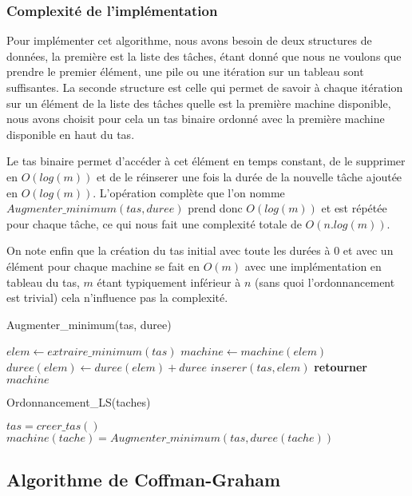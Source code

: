 \subsubsection{Complexité de l'implémentation}
Pour implémenter cet algorithme, nous avons besoin de deux structures de 
données, la première est la liste des tâches, étant donné que nous ne voulons 
que prendre le premier élément, une pile ou une itération sur un tableau sont 
suffisantes. La seconde structure est celle qui permet de savoir à chaque 
itération sur un élément de la liste des tâches quelle est la première machine 
disponible, nous avons choisit pour cela un tas binaire ordonné avec la première 
machine disponible en haut du tas.

Le tas binaire permet d'accéder à cet élément en temps constant, de le supprimer 
en $O(log(m))$ et de le réinserer une fois la durée de la nouvelle tâche ajoutée 
en $O(log(m))$.
L'opération complète que l'on nomme $Augmenter\_minimum(tas, duree)$ prend donc 
$O(log(m))$ et est répétée pour chaque tâche, ce qui nous fait une complexité 
totale de $O(n.log(m))$.

On note enfin que la création du tas initial avec toute les durées à 0 et avec 
un élément pour chaque machine se fait en $O(m)$ avec une implémentation en 
tableau du tas, $m$ étant typiquement inférieur à $n$ (sans quoi 
l'ordonnancement est trivial) cela n'influence pas la complexité.
\begin{algorithm}
\caption{Augmenter\_minimum(tas, duree)}
\begin{algorithmic}
\STATE $elem \leftarrow extraire\_minimum(tas)$
\STATE $machine \leftarrow machine(elem)$
\STATE $duree(elem) \leftarrow duree(elem) + duree$
\STATE $inserer(tas, elem)$
\STATE \textbf{retourner} $machine$
\end{algorithmic}
\end{algorithm}

\begin{algorithm}
\caption{Ordonnancement\_LS(taches)}
\begin{algorithmic}
\STATE $tas = creer\_tas()$
\STATE $machine(tache) = Augmenter\_minimum(tas, duree(tache))$
\ENDFOR
\end{algorithmic}
\end{algorithm}
\subsection{Algorithme de Coffman-Graham}


